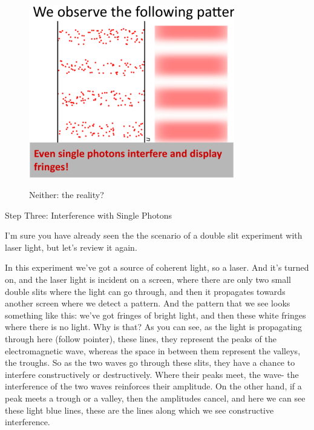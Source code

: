 \begin{figure}[H]
   \centering
    \includegraphics[width=0.8\textwidth]{lesson6/block_neither_reality.pdf}
    \label{fig: 1}
    
        \caption{Neither: the reality?}
    
\end{figure}

Step Three: Interference with Single Photons

I'm sure you have already seen the the scenario of a double slit experiment with laser light, but let's review it again.

In this experiment we've got a source of coherent light, so a laser. And it's turned on, and the laser light is incident on a screen, where there are only two small double slits where the light can go through, and then it propagates towards another screen where we detect a pattern. And the pattern that we see looks something like this: we've got fringes of bright light, and then these white fringes where there is no light. Why is that? As you can see, as the light is propagating through here (follow pointer), these lines, they represent the peaks of the electromagnetic wave, whereas the space in between them represent the valleys, the troughs. So as the two waves go through these slits, they have a chance to interfere constructively or destructively. Where their peaks meet, the wave- the interference of the two waves reinforces their amplitude. On the other hand, if a peak meets a trough or a valley, then the amplitudes cancel, and here we can see these light blue lines, these are the lines along which we see constructive interference.

